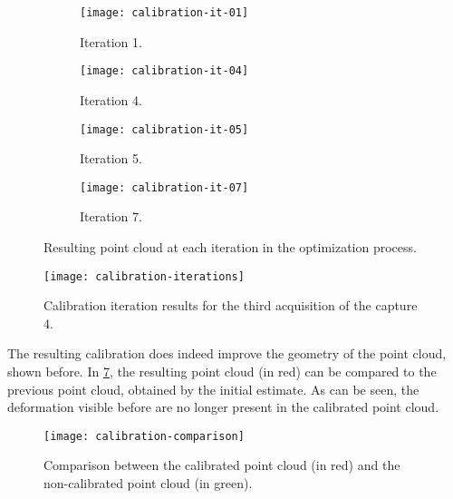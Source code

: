 \begin{figure}[h]
    
    \centering
    \begin{subfigure}[t]{0.5\textwidth}
        \texttt{[image: calibration-it-01]}
        \caption{Iteration 1.}
        \label{figure:calibration-it-1}
    \end{subfigure}%
    \begin{subfigure}[t]{0.5\textwidth}
        \texttt{[image: calibration-it-04]}
        \caption{Iteration 4.}
        \label{figure:calibration-it-4}
    \end{subfigure}

    \begin{subfigure}[t]{0.5\textwidth}
        \texttt{[image: calibration-it-05]}
        \caption{Iteration 5.}
        \label{figure:calibration-it-5}
    \end{subfigure}%
    \begin{subfigure}[t]{0.5\textwidth}
        \texttt{[image: calibration-it-07]}
        \caption{Iteration 7.}
        \label{figure:calibration-it-7}
    \end{subfigure}

    \caption{Resulting point cloud at each iteration in the optimization process.}
    \label{figure:calibration-iterations}

\end{figure}

\begin{figure}[h]

    \centering
    \texttt{[image: calibration-iterations]}
    
    \caption{Calibration iteration results for the third acquisition of the capture 4.}
    \label{figure:calibration-results-acquisition-3}
\end{figure}

The resulting calibration does indeed improve the geometry of the point cloud, shown before. In \cref{figure:calibration-comparison}, the resulting point cloud (in red) can be compared to the previous point cloud, obtained by the initial estimate. As can be seen, the deformation visible before are no longer present in the calibrated point cloud.

\begin{figure}[h]
    \centering
    \texttt{[image: calibration-comparison]}
    \caption{Comparison between the calibrated point cloud (in red) and the non-calibrated point cloud (in green).}
    \label{figure:calibration-comparison}
\end{figure}

